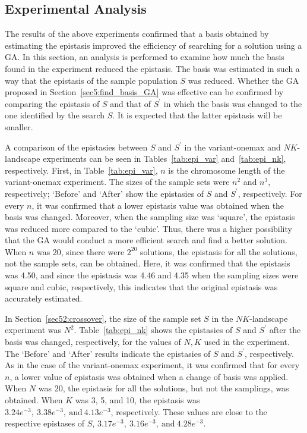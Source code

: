 \subsection{Experimental Analysis}
The results of the above experiments confirmed that a basis obtained by estimating the epistasis improved the efficiency of searching for a solution using a GA. In this section, an analysis is performed to examine how much the basis found in the experiment reduced the epistasis. The basis was estimated in such a way that the epistasis of the sample population $ S $ was reduced. Whether the GA proposed in Section~\ref{sec5:find_basis_GA} was effective can be confirmed by comparing the epistasis of $ S $ and that of $ S^\prime $ in which the basis was changed to the one identified by the search $ S $. It is expected that the latter epistasis will be smaller.

A comparison of the epistasies between $ S $ and $ S^\prime $ in the variant-onemax and $ NK $-landscape experiments can be seen in Tables~\ref{tab:epi_var} and~\ref{tab:epi_nk}, respectively. First, in Table~\ref{tab:epi_var}, $ n $ is the chromosome length of the variant-onemax experiment. The sizes of the sample sets were $ n^2 $ and $ n^3 $, respectively; `Before' and `After' show the epistasies of $ S $ and $ S^\prime $, respectively. For every $ n $, it was confirmed that a lower epistasis value was obtained when the basis was changed. Moreover, when the sampling size was `square', the epistasis was reduced more compared to the `cubic'. Thus, there was a higher possibility that the GA would conduct a more efficient search and find a better solution. When $ n $ was 20, since there were $ 2^{20} $ solutions, the epistasis for all the solutions, not the sample sets, can be obtained. Here, it was confirmed that the epistasis was 4.50, and since the epistasis was 4.46 and 4.35 when the sampling sizes were square and cubic, respectively, this indicates that the original epistasis was accurately estimated.

In Section~\ref{sec52:crossover}, the size of the sample set $ S $ in the $ NK $-landscape experiment was $ N^2 $. Table~\ref{tab:epi_nk} shows the epistasies of $ S $ and $ S^\prime $ after the basis was changed, respectively, for the values of $ N,K $ used in the experiment. The `Before' and `After' results indicate the epistasies of $ S $ and $ S^\prime $, respectively. As in the case of the variant-onemax experiment, it was confirmed that for every $ n $, a lower value of epistasis was obtained when a change of basis was applied. When $ N $ was $ 20 $, the epistasis for all the solutions, but not the samplings, was obtained. When $ K $ was 3, 5, and 10, the epistasis was $ 3.24e^{-3},\ 3.38e^{-3},\ \text{and}\ 4.13e^{-3} $, respectively. These values are close to the respective epistases of $ S $, $ 3.17e^{-3},\ 3.16e^{-3},\ \text{and}\ 4.28e^{-3} $.


